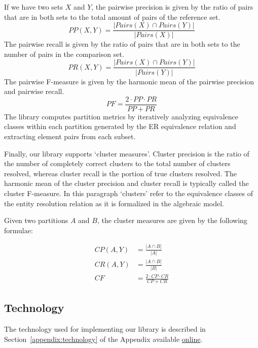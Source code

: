 \documentclass[a4paper,twoside]{article}
\newcommand{\appendixurl}{https://www.cs.ubbcluj.ro/~andrei.olar/article-data/er-metrics-library/02_appendix.pdf}
\begin{document}
    If we have two sets $X$ and $Y$, the pairwise precision is given by the
    ratio of pairs that are in both sets to the total amount of pairs of the
    reference set.
    \begin{equation}
        PP(X, Y) = \frac{|{Pairs(X)}\cap{Pairs(Y)}|}{|Pairs(X)|}
    \end{equation}    
    The pairwise recall is given by the ratio of pairs that are in both sets
    to the number of pairs in the comparison set\cite{hitesh2012}.
    \begin{equation}
        PR(X, Y) = \frac{|{Pairs(X)}\cap{Pairs(Y)}|}{|Pairs(Y)|}
    \end{equation}
    The pairwise F-measure is given by the harmonic mean of the pairwise
    precision and pairwise recall.
    \begin{equation}
        PF = \frac{2 \cdot PP \cdot PR}{PP + PR}
    \end{equation}
    The library computes partition metrics by iteratively analyzing equivalence
    classes within each partition generated by the ER equivalence relation and
    extracting element pairs from each subset.
    
    Finally, our library supports `cluster measures'\cite{hitesh2012}.
    Cluster precision is the ratio of the number of completely correct
    clusters to the total number of clusters resolved, whereas cluster recall
    is the portion of true clusters resolved\cite{huang2006efficient}.
    The harmonic mean of the cluster precision and cluster recall is typically
    called the cluster F-measure.
    In this paragraph `clusters' refer to the equivalence classes of the entity
    resolution relation as it is formalized in the algebraic model.
    
    Given two partitions $A$ and $B$, the cluster measures are given by the
    following formulae:

    \begin{align}
        CP(A, Y) &= \frac{|{A}\cap{B}|}{|A|}\\
        CR(A, Y) &= \frac{|{A}\cap{B}|}{|B|}\\
        CF &= \frac{2\cdot{CP}\cdot{CR}}{CP + CR}
    \end{align}

    \subsection{Technology}\label{sec:tech}

    The technology used for implementing our library is described in
    Section~\ref{appendix:technology} of the Appendix available \href{\appendixurl}{online}.
    
\end{document}
